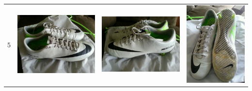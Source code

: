 \begin{longtable}{| l | l | l | l |}
	\multirow{6}{*}{5} & \includegraphics[scale=0.25]{images/ground_truth/5/image_1} & \includegraphics[scale=0.25]{images/ground_truth/5/image_2} & \includegraphics[scale=0.25]{images/ground_truth/5/image_3} \\

\end{longtable}
